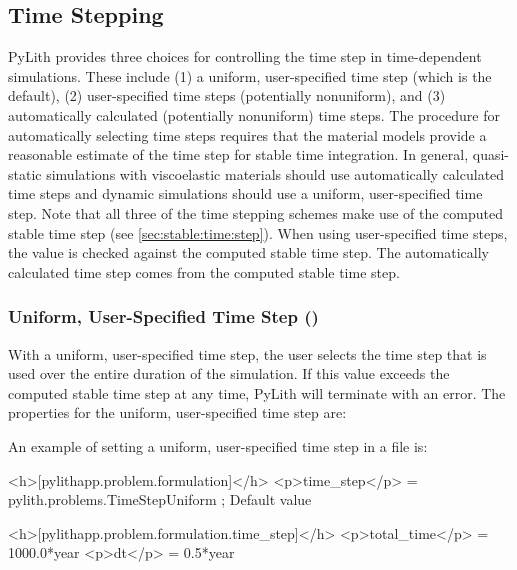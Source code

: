 \subsection{Time Stepping}
\label{sec:time-stepping}

PyLith provides three choices for controlling the time step in time-dependent
simulations. These include (1) a uniform, user-specified time step
(which is the default), (2) user-specified time steps (potentially
nonuniform), and (3) automatically calculated (potentially nonuniform)
time steps. The procedure for automatically selecting time steps requires
that the material models provide a reasonable estimate of the time
step for stable time integration. In general, quasi-static simulations
with viscoelastic materials should use automatically calculated time
steps and dynamic simulations should use a uniform, user-specified
time step. Note that all three of the time stepping schemes make use
of the computed stable time step (see \vref{sec:stable:time:step}).
When using user-specified time steps, the value is checked against
the computed stable time step. The automatically calculated time step
comes from the computed stable time step.


\subsubsection{Uniform, User-Specified Time Step ()}

With a uniform, user-specified time step, the user selects the time
step that is used over the entire duration of the simulation. If this
value exceeds the computed stable time step at any time, PyLith will
terminate with an error. The properties for the uniform, user-specified
time step are:
\begin{inventory}
\end{inventory}
An example of setting a uniform, user-specified time step in a 
file is:
\begin{cfg}
<h>[pylithapp.problem.formulation]</h>
<p>time_step</p> = pylith.problems.TimeStepUniform ; Default value

<h>[pylithapp.problem.formulation.time_step]</h>
<p>total_time</p> = 1000.0*year
<p>dt</p> = 0.5*year
\end{cfg}

